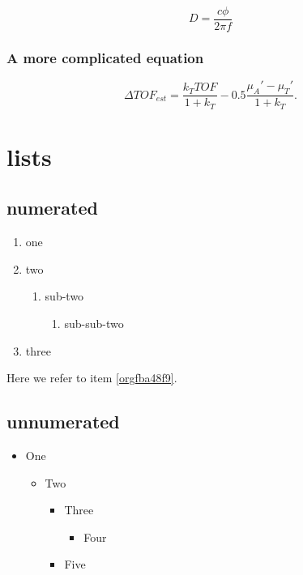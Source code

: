 \begin{equation}
\label{eq:orgb691db4}
D = \frac{c\phi}{2\pi f}
\end{equation}

\subsubsection{A more complicated equation}
\label{sec:org3d35f7e}

\begin{equation}
\Delta TOF_{est} = \frac{k_T TOF}{1+k_T } - 0.5 \frac{\mu_A' - \mu_T'}{1+k_T}.
\end{equation}

\section{lists}
\label{sec:org1d3f34e}
\subsection{numerated}
\label{sec:orgaf5f11a}
\begin{enumerate}
\item one
\item two
\begin{enumerate}
\item sub-two
\begin{enumerate}
\item sub-sub-two
\end{enumerate}
\end{enumerate}
\item \label{orgfba48f9}three
\end{enumerate}

Here we refer to item \ref{orgfba48f9}.

\subsection{unnumerated}
\label{sec:orgdb0a71f}
\begin{itemize}
\item One
\begin{itemize}
\item Two
\begin{itemize}
\item Three
\begin{itemize}
\item Four
\end{itemize}
\item Five
\end{itemize}
\end{itemize}
\end{itemize}

